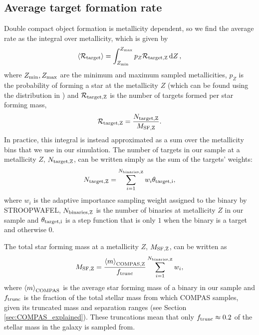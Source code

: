 \subsection{Average target formation rate}
Double compact object formation is metallicity dependent, so we find the average rate as the integral over metallicity, which is given by
\begin{equation}\label{eq:norm_avg_target_formation}
    \avg{ \mathcal{R}_{\rm target} } = \int_{Z_{\rm min}}^{Z_{\rm max}} p_{Z} \mathcal{R}_{\rm target, Z} \dd{Z},
\end{equation}
where $Z_{\rm min}, Z_{\rm max}$ are the minimum and maximum sampled metallicities, $p_Z$ is the probability of forming a star at the metallicity $Z$ (which can be found using the distribution in \citealp{Frankel+2018}) and $\mathcal{R}_{\rm target, Z}$ is the number of targets formed per star forming mass,
\begin{equation}
    \mathcal{R}_{\rm target, Z} =  \frac{N_{\rm target, Z}}{ M_{\rm SF, Z} }.
\end{equation}
In practice, this integral is instead approximated as a sum over the metallicity bins that we use in our simulation. The number of targets in our sample at a metallicity $Z$, $N_{\rm target, Z}$, can be written simply as the sum of the targets' weights:
\begin{equation}
    N_{\rm target, Z} = \sum_{i=1}^{N_{\rm binaries, Z}} w_i \theta_{\rm target, i},
\end{equation}
where $w_i$ is the adaptive importance sampling weight assigned to the binary by STROOPWAFEL, $N_{\rm binaries, Z}$ is the number of binaries at metallicity $Z$ in our sample and $\theta_{\rm target, i}$ is a step function that is only $1$ when the binary is a target and otherwise $0$.

The total star forming mass at a metallicity $Z$, $M_{\rm SF, Z}$, can be written as
\begin{equation}
    M_{\rm SF, Z} = \frac{\avg{m}_{\rm COMPAS, Z}}{f_{\rm trunc}} \sum_{i=1}^{N_{\rm binaries, Z}} w_i,
\end{equation}
where $\left\langle m\right\rangle_{\rm COMPAS}$ is the average star forming mass of a binary in our sample and $f_{\rm trunc}$ is the fraction of the total stellar mass from which COMPAS samples, given its truncated mass and separation ranges (see Section \ref{sec:COMPAS_explained}). These truncations mean that only $f_{\rm trunc} \approx 0.2$ of the stellar mass in the galaxy is sampled from.

